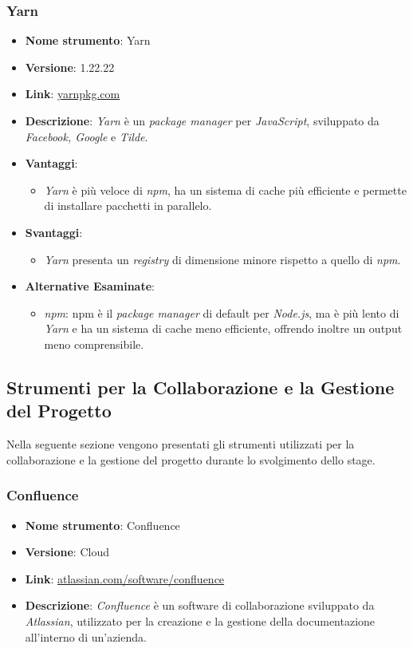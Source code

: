 \subsubsection{Yarn}
\begin{itemize}
    \item \textbf{Nome strumento}: Yarn
    \item \textbf{Versione}: 1.22.22
    \item \textbf{Link}: \href{https://yarnpkg.com/}{yarnpkg.com}
    \item \textbf{Descrizione}: \textit{Yarn} è un \textit{package manager} per \textit{JavaScript}, sviluppato da \textit{Facebook, Google} e \textit{Tilde}.
    \item \textbf{Vantaggi}:
          \begin{itemize}
              \item \textit{Yarn} è più veloce di \textit{npm}, ha un sistema di cache più efficiente e permette di installare pacchetti in parallelo.
          \end{itemize}
    \item \textbf{Svantaggi}:
          \begin{itemize}
              \item \textit{Yarn} presenta un \textit{registry} di dimensione minore rispetto a quello di \textit{npm}.
          \end{itemize}
    \item \textbf{Alternative Esaminate}:
          \begin{itemize}
              \item \textit{npm}: npm è il \textit{package manager} di default per \textit{Node.js}, ma è più lento di \textit{Yarn} e ha un sistema di cache meno efficiente,
                    offrendo inoltre un output meno comprensibile.
          \end{itemize}
\end{itemize}

\subsection{Strumenti per la Collaborazione e la Gestione del Progetto}
Nella seguente sezione vengono presentati gli strumenti utilizzati per la collaborazione e la gestione del progetto durante lo svolgimento dello stage.

\subsubsection{Confluence}
\begin{itemize}
    \item \textbf{Nome strumento}: Confluence
    \item \textbf{Versione}: Cloud
    \item \textbf{Link}: \href{https://www.atlassian.com/software/confluence}{atlassian.com/software/confluence}
    \item \textbf{Descrizione}: \textit{Confluence} è un software di collaborazione sviluppato da \textit{Atlassian}, utilizzato per la creazione e la gestione della documentazione
          all'interno di un'azienda.
\end{itemize}

